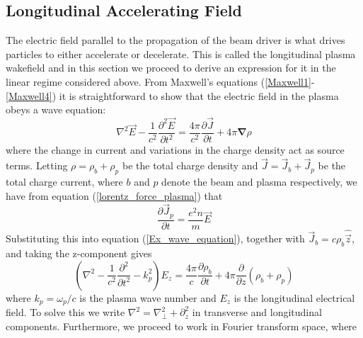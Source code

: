 \subsection{Longitudinal Accelerating Field} 
The electric field parallel to the propagation of the beam driver is what drives particles to either accelerate or decelerate. This is called the longitudinal plasma wakefield and in this section we proceed to derive an expression for it in the linear regime considered above. 
From Maxwell's equations (\ref{Maxwell1}-\ref{Maxwell4}) it is straightforward to show that the electric field in the plasma obeys a wave equation:
\begin{equation}
\nabla^2\vec{E}-\frac{1}{c^2}\frac{\partial^2 \vec{E}}{\partial t^2}=\frac{4\pi}{c^2}\frac{\partial \vec{J}}{\partial t}+4\pi\boldsymbol{\nabla}\rho
\label{E_wave_equation}
\end{equation}
where the change in current and variations in the charge density act as source terms. Letting $\rho=\rho_b+\rho_p$ be the total charge density and $\vec{J}=\vec{J}_b+\vec{J}_p$ be the total charge current, where $b$ and $p$ denote the beam and plasma respectively, we have from equation (\ref{lorentz_force_plasma}) that 
\begin{equation}
\frac{\partial \vec{J}_p}{\partial t}=\frac{e^2 n}{m}\vec{E}
\end{equation}
Substituting this into equation (\ref{Ex_wave_equation}), together with $\vec{J}_b=c\rho_b\hat{\vec{z}}$, and taking the z-component gives
\begin{equation}
\left(\nabla^2-\frac{1}{c^2}\frac{\partial^2}{\partial t^2}-k_p^2\right)E_z=\frac{4\pi}{c}\frac{\partial \rho_b}{\partial t}+4\pi\frac{\partial}{\partial z}\left(\rho_b+\rho_p\right)
\label{Ez_wave_equation}
\end{equation}
where $k_p=\omega_p/c$ is the plasma wave number and $E_z$ is the longitudinal electrical field. To solve this we write $\nabla^2=\nabla^2_{\perp}+\partial^2_z$ in  transverse and longitudinal components. Furthermore, we proceed to work in Fourier transform space, where
